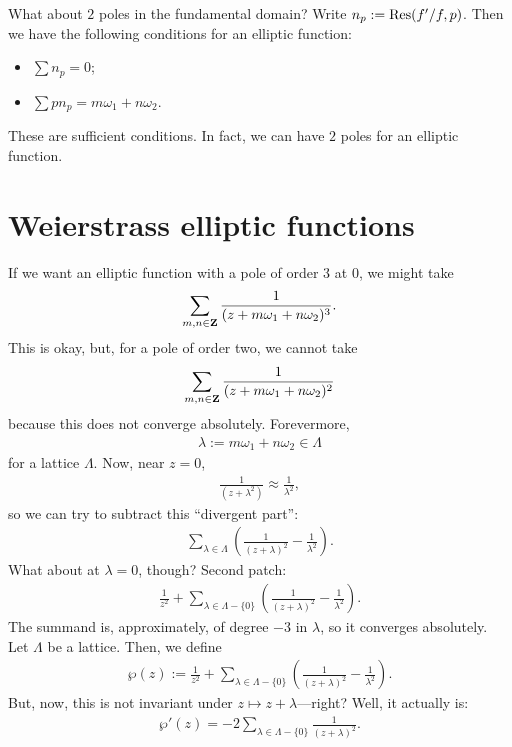 \documentclass[11pt, oneside,margin=1in]{article}
\begin{document}
What about $2$ poles in the fundamental domain? Write $n_p := \operatorname{Res}(f'/f, p)$. Then we have the following conditions for an elliptic function:
\begin{itemize}
	\item $\sum n_p = 0$;
	\item $\sum p n_p = m\omega_1+n\omega_2$. 
\end{itemize}
These are sufficient conditions. In fact, we can have $2$ poles for an elliptic function. 
\section{Weierstrass elliptic functions}
If we want an elliptic function with a pole of order $3$ at $0$, we might take
\begin{align*}
	\sum_{m,n\in\mathbf Z}^{} \frac{1}{(z+m\omega_1+n\omega_2)^3}.
\end{align*}
This is okay, but, for a pole of order two, we cannot take
\begin{align*}
	\sum_{m,n\in\mathbf Z}^{} \frac{1}{(z+m\omega_1+n\omega_2)^2}
\end{align*}
because this does not converge absolutely. Forevermore, 
\begin{align*}
	\lambda := m\omega_1+n\omega_2 \in \Lambda
\end{align*}
for a lattice $\Lambda$. Now, near $z=0$,
\begin{align*}
	\frac{1}{(z+\lambda^2)}\approx \frac{1}{\lambda^2},
\end{align*}
so we can try to subtract this ``divergent part'':
\begin{align*}
	\sum_{\lambda\in\Lambda}^{} \left(\frac{1}{(z+\lambda) ^2} - \frac{1}{\lambda^2}\right).
\end{align*}
What about at $\lambda = 0$, though? Second patch:
\begin{align*}
	\frac{1}{z^2} + \sum_{\lambda\in\Lambda-\{0\}}^{} \left( \frac{1}{(z+\lambda) ^2}-\frac{1}{\lambda^2} \right) .
\end{align*}
The summand is, approximately, of degree $-3$ in $\lambda$, so it converges absolutely. Let $\Lambda$ be a lattice. Then, we define
\begin{align*}
	 \wp (z) :=  \frac{1}{z^2} + \sum_{\lambda\in \Lambda-\{0\}} \left( \frac{1}{(z+\lambda) ^2}-\frac{1}{\lambda^2} \right). 
\end{align*}
But, now, this is not invariant under $z\longmapsto z+\lambda$---right? Well, it actually is:
\begin{align*}
	\wp'(z) = -2\sum_{\lambda\in\Lambda-\{0\}}^{} \frac{1}{(z+\lambda) ^2}.
\end{align*}
\end{document}
